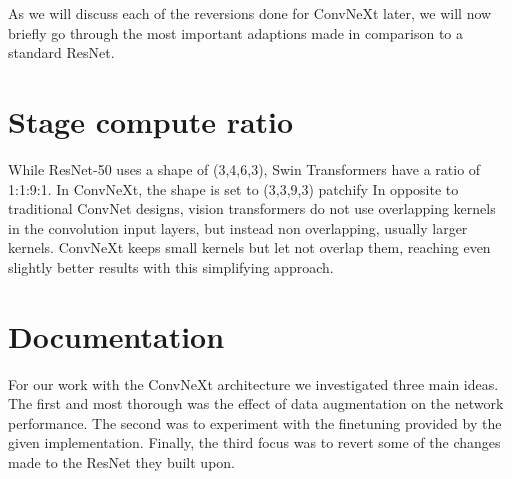 \documentclass{article}
\begin{document}
As we will discuss each of the reversions done for ConvNeXt later, we will now briefly go through the most important adaptions made in comparison to a standard ResNet.

\section {Stage compute ratio}
While ResNet-50 uses a shape of (3,4,6,3), Swin Transformers have a ratio of 1:1:9:1. In ConvNeXt, the shape is set to (3,3,9,3)
patchify
In opposite to traditional ConvNet designs, vision transformers do not use overlapping kernels in the convolution input layers, but instead non overlapping, usually larger kernels. ConvNeXt keeps small kernels but let not overlap them, reaching even slightly better results with this simplifying approach.




\section{Documentation}\label{sec:documentation}
For our work with the ConvNeXt architecture we investigated three main ideas.
The first and most thorough was the effect of data augmentation on the network performance.
The second was to experiment with the finetuning provided by the given implementation.
Finally, the third focus was to revert some of the changes~ made to the ResNet they built upon.
\end{document}
